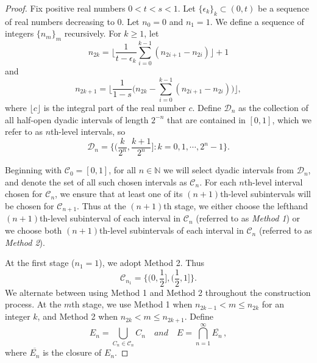 \documentclass[10pt,a4paper]{amsart}
\begin{document}
	\begin{proof}
		Fix positive real numbers $0<t<s<1$. Let $\{\epsilon_k\}_k\subset (0,t)$ be a sequence of real numbers  decreasing to $0$. Let  $n_0=0$ and $n_1=1$.  We define a sequence of integers $\{n_m\}_m$ recursively.
		 For $k\geq1$, let
		\begin{equation}\label{n2k}
			n_{2k}=\bigg\lfloor\frac{1}{t-\epsilon_k}\sum_{i=0}^{k-1}(n_{2i+1}-n_{2i})  \bigg\rfloor+1
		\end{equation}	
		and 
		\begin{equation}\label{n2k1}
			n_{2k+1}=\bigg\lfloor\frac{1}{1-s}\Big(n_{2k}-\sum_{i=0}^{k-1}(n_{2i+1}-n_{2i})\Big)\bigg\rfloor,
		\end{equation}	
	 where $\lfloor c\rfloor$ is  the integral part of the real number $c$.
		 Define $\mathcal{D}_n$ as the collection of all half-open dyadic intervals of length  $2^{-n}$  that are contained in $[0,1]$, which we refer to as $n$th-level intervals, so 
		\begin{equation*}
			\mathcal{D}_n=\bigg\{\Big(\frac{k}{2^n},\frac{k+1}{2^n}\Big]:k=0,1,\cdots,2^n-1\bigg\}.
		\end{equation*}

Beginning with $\mathcal{C}_0=[0,1]$, for all   $n\in\mathbb{N}$ we will select dyadic intervals from $\mathcal{D}_n$, and  denote the set of all such chosen intervals as $\mathcal{C}_n$. 
		For each $n$th-level interval chosen for $\mathcal{C}_n$,  we ensure that at least one of  its $(n+1)$th-level subintervals will be chosen for $\mathcal{C}_{n+1}$. 
		 Thus at the $(n+1)$th stage, we either choose the lefthand $(n+1)$th-level subinterval of  each interval in $\mathcal{C}_n$ (referred to as {\it Method 1})  or we choose both	$(n+1)$th-level subintervals of  each  interval in $\mathcal{C}_n$ (referred to as  {\it Method 2}).
		 
		At the first stage ($n_1=1$), we adopt Method 2. Thus
		\begin{equation*}
			\textstyle{\mathcal{C}_{n_1}=\big\{(0,\frac{1}{2}],(\frac{1}{2},1]\big\}.}
		\end{equation*}
		We alternate between using Method 1 and Method 2 throughout the construction process.
		At the $m$th stage, we use Method 1 when $n_{2k-1}<m\leq n_{2k}$ for an integer $k$,  and Method 2 when $n_{2k}<m\leq n_{2k+1}$.
			Define
		\begin{equation*}
			E_n=\bigcup_{C_n\in \mathcal{C}_n}C_n \quad\textit{and}\quad E=\bigcap_{n =1}^\infty \overline{E_n}\, ,
		\end{equation*}
		where $\overline{E_n}$ is the closure of $E_n$.
		

\end{proof}
\end{document}
